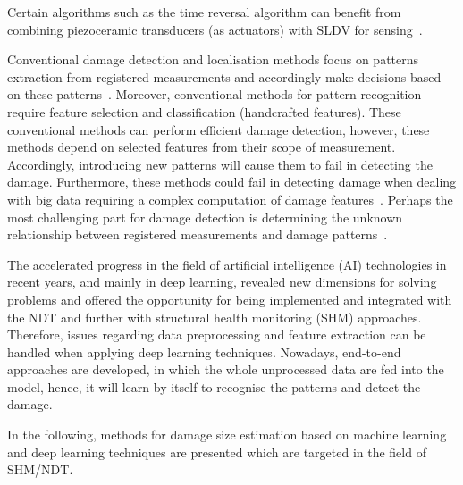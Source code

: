 \documentclass[preprint,9pt]{elsarticle}
\begin{document}
Certain algorithms such as the time reversal algorithm can benefit from combining piezoceramic transducers (as actuators) with SLDV for sensing~\cite{Girolamo2018a, Miniaci2019}.
    
Conventional damage detection and localisation methods focus on patterns extraction from registered measurements and accordingly make decisions based on these patterns~\cite{Gul2009}. 
Moreover, conventional methods for pattern recognition require feature selection and classification (handcrafted features). 
These conventional methods can perform efficient damage detection, however, these methods depend on selected features from their scope of measurement.
Accordingly, introducing new patterns will cause them to fail in detecting the damage.
Furthermore, these methods could fail in detecting damage when dealing with big data requiring a complex computation of damage features~\cite{Gulgec2019}.
Perhaps the most challenging part for damage detection is determining the unknown relationship between registered measurements and damage patterns~\cite{Gulgec2019}. 
    
The accelerated progress in the field of artificial intelligence (AI) technologies in recent years, and mainly in deep learning, revealed new dimensions for solving problems and offered the opportunity for being implemented and integrated with the NDT and further with structural health monitoring (SHM) approaches.
Therefore, issues regarding data preprocessing and feature extraction can be handled when applying deep learning techniques. 
Nowadays, end-to-end approaches are developed, in which the whole unprocessed data are fed into the model, hence, it will learn by itself to recognise the patterns and detect the damage.
    
In the following, methods for damage size estimation based on machine learning and deep learning techniques are presented which are targeted in the field of SHM/NDT.
  	
\end{document}
